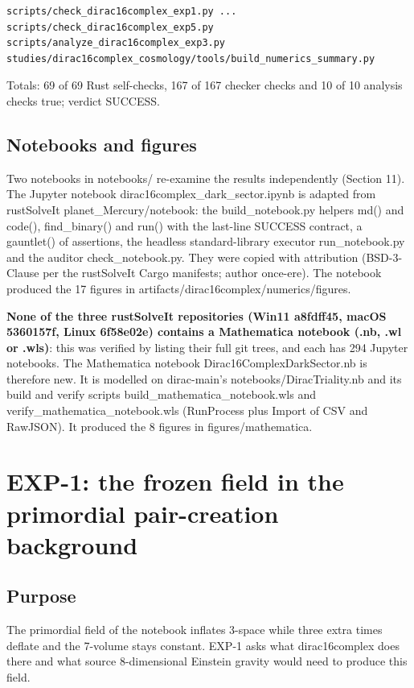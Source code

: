 \documentclass[11pt]{article}
\begin{document}
\begin{Verbatim}[fontsize=\small]
scripts/check_dirac16complex_exp1.py ... scripts/check_dirac16complex_exp5.py
scripts/analyze_dirac16complex_exp3.py
studies/dirac16complex_cosmology/tools/build_numerics_summary.py
\end{Verbatim}

Totals: 69 of 69 Rust self-checks, 167 of 167 checker checks and 10 of 10 analysis checks true; verdict SUCCESS.

\subsection{Notebooks and figures}

Two notebooks in notebooks/ re-examine the results independently (Section 11). The Jupyter notebook dirac16complex\_dark\_sector.ipynb is adapted from rustSolveIt planet\_Mercury/notebook: the build\_notebook.py helpers md() and code(), find\_binary() and run() with the last-line SUCCESS contract, a gauntlet() of assertions, the headless standard-library executor run\_notebook.py and the auditor check\_notebook.py. They were copied with attribution (BSD-3-Clause per the rustSolveIt Cargo manifests; author once-ere). The notebook produced the 17 figures in artifacts/dirac16complex/numerics/figures.

\textbf{None of the three rustSolveIt repositories (Win11 a8fdff45, macOS 5360157f, Linux 6f58e02e) contains a Mathematica notebook (.nb, .wl or .wls)}: this was verified by listing their full git trees, and each has 294 Jupyter notebooks. The Mathematica notebook Dirac16ComplexDarkSector.nb is therefore new. It is modelled on dirac-main's notebooks/DiracTriality.nb and its build and verify scripts build\_mathematica\_notebook.wls and verify\_mathematica\_notebook.wls (RunProcess plus Import of CSV and RawJSON). It produced the 8 figures in figures/mathematica.

\section{EXP-1: the frozen field in the primordial pair-creation background}

\subsection{Purpose}

The primordial field of the notebook inflates 3-space while three extra times deflate and the 7-volume stays constant. EXP-1 asks what dirac16complex does there and what source 8-dimensional Einstein gravity would need to produce this field.
\end{document}
